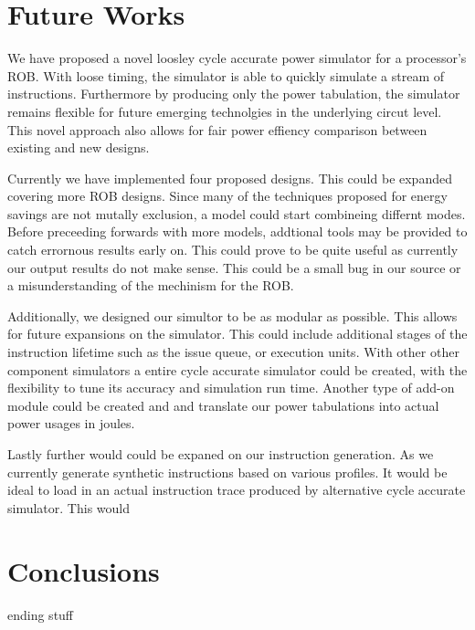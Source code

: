 \section{Future Works}
We have proposed a novel loosley cycle accurate power simulator for a processor's
ROB.  With loose timing, the simulator is able to quickly simulate a stream of
instructions.  Furthermore by producing only the power tabulation, the simulator
remains flexible for future emerging technolgies in the underlying circut level.
This novel approach also allows for fair power effiency comparison between
existing and new designs.

Currently we have implemented four proposed designs.  This could be expanded covering 
more ROB designs. Since many of the techniques proposed for energy savings
are not mutally exclusion, a model could start combineing differnt modes.
Before preceeding forwards with more models, addtional tools may  be provided to
catch errornous results early on.  This could prove to be quite useful as currently
our output results do not make sense.  This could be a small bug in our source or
a misunderstanding of the mechinism for the ROB.

Additionally, we designed our simultor to be as modular as possible.  This allows
for future expansions on the simulator. This could include additional stages of 
the instruction lifetime such as the issue queue, or execution units.  With other
other component simulators a entire cycle accurate simulator could be created, with 
the flexibility to tune its accuracy and simulation run time. Another type of 
add-on module could be created and and translate our power tabulations into actual
power usages in joules.

Lastly further would could be expaned on our instruction generation.  As we 
currently generate synthetic instructions based on various profiles.  It would
be ideal to load in an actual instruction trace produced by alternative cycle 
accurate simulator.  This would 

\section{Conclusions}
ending stuff
